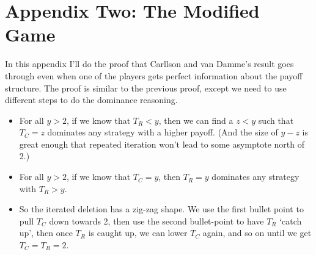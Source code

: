 \section{Appendix Two: The Modified Game}
\label{appendixtwo:themodifiedgame}

In this appendix I'll do the proof that Carllson and van Damme's result goes through even when one of the players gets perfect information about the payoff structure. The proof is similar to the previous proof, except we need to use different steps to do the dominance reasoning.

\begin{itemize}
\item For all $y > 2$, if we know that $T_R < y$, then we can find a $z < y$ such that $T_C = z$ dominates any strategy with a higher payoff. (And the size of $y - z$ is great enough that repeated iteration won't lead to some asymptote north of 2.)

\item For all $y > 2$, if we know that $T_C = y$, then $T_R = y$ dominates any strategy with $T_R > y$.

\item So the iterated deletion has a zig-zag shape. We use the first bullet point to pull $T_C$ down towards 2, then use the second bullet-point to have $T_R$ `catch up', then once $T_R$ is caught up, we can lower $T_C$ again, and so on until we get $T_C = T_R = 2$.
\end{itemize}


